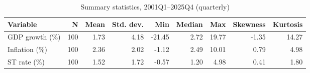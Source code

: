 \begin{table}

\caption{\label{tab:summary-stats}Summary statistics, 2001Q1--2025Q4 (quarterly)}
\centering
\begin{tabular}[t]{lrrrrrrrr}
\toprule
Variable & N & Mean & Std. dev. & Min & Median & Max & Skewness & Kurtosis\\
\midrule
GDP growth (\%) & 100 & 1.73 & 4.18 & -21.45 & 2.72 & 19.77 & -1.35 & 14.27\\
Inflation (\%) & 100 & 2.36 & 2.02 & -1.12 & 2.49 & 10.01 & 0.79 & 4.98\\
ST rate (\%) & 100 & 1.52 & 1.72 & -0.57 & 1.20 & 4.98 & 0.41 & 1.80\\
\bottomrule
\end{tabular}
\end{table}
